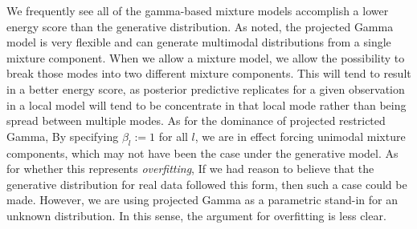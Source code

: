 We frequently see all of the gamma-based mixture models accomplish a lower energy score than the generative
  distribution.  As \cite{nunez2019} noted, the projected Gamma model is very flexible and can generate
  multimodal distributions from a single mixture component.  When we allow a mixture model, we allow
  the possibility to break those modes into two different mixture components.  This will tend to
  result in a better energy score, as posterior predictive replicates for a given observation in a local
  model will tend to be concentrate in that local mode rather than being spread between multiple
  modes.  As for the dominance of projected restricted Gamma, By specifying $\beta_l := 1$ for all
  $l$, we are in effect forcing unimodal mixture components, which may not have been the case under
  the generative model.  As for whether this represents \emph{overfitting}, If we had reason to
  believe that the generative distribution for real data followed this form, then such a case could
  be made.  However, we are using projected Gamma as a parametric stand-in for an unknown distribution.
  In this sense, the argument for overfitting is less clear.

